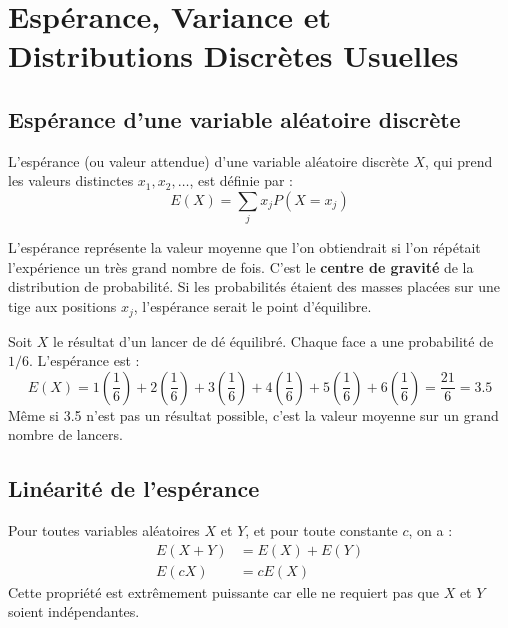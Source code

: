 \newpage
\section{Espérance, Variance et Distributions Discrètes Usuelles}

\subsection{Espérance d'une variable aléatoire discrète}

\begin{definitionbox}[Espérance]
L'espérance (ou valeur attendue) d'une variable aléatoire discrète $X$, qui prend les valeurs distinctes $x_1, x_2, \dots$, est définie par :
$$ E(X) = \sum_j x_j P(X=x_j) $$
\end{definitionbox}

\begin{intuitionbox}
L'espérance représente la valeur moyenne que l'on obtiendrait si l'on répétait l'expérience un très grand nombre de fois. C'est le \textbf{centre de gravité} de la distribution de probabilité. Si les probabilités étaient des masses placées sur une tige aux positions $x_j$, l'espérance serait le point d'équilibre.
\end{intuitionbox}

\begin{examplebox}[Lancer d'un dé]
Soit $X$ le résultat d'un lancer de dé équilibré. Chaque face a une probabilité de $1/6$. L'espérance est :
$$ E(X) = 1\left(\frac{1}{6}\right) + 2\left(\frac{1}{6}\right) + 3\left(\frac{1}{6}\right) + 4\left(\frac{1}{6}\right) + 5\left(\frac{1}{6}\right) + 6\left(\frac{1}{6}\right) = \frac{21}{6} = 3.5 $$
Même si 3.5 n'est pas un résultat possible, c'est la valeur moyenne sur un grand nombre de lancers.
\end{examplebox}

\subsection{Linéarité de l'espérance}

\begin{theorembox}
Pour toutes variables aléatoires $X$ et $Y$, et pour toute constante $c$, on a :
\begin{align*}
E(X+Y) &= E(X) + E(Y) \\
E(cX) &= cE(X)
\end{align*}
Cette propriété est extrêmement puissante car elle ne requiert pas que $X$ et $Y$ soient indépendantes.
\end{theorembox}

